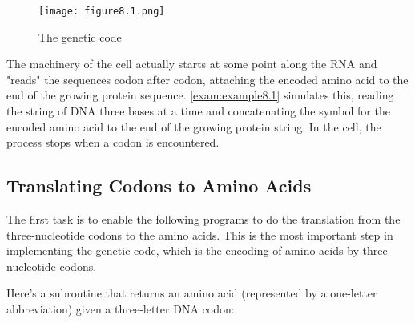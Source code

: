 \begin{figure}
  \centering
  \texttt{[image: figure8.1.png]}
  \caption{The genetic code}
  \label{fig:figure8.1}
\end{figure}

The machinery of the cell actually starts at some point along the RNA and "reads" the sequences codon after codon, attaching the encoded amino acid to the end of the growing protein sequence. \autoref{exam:example8.1} simulates this, reading the string of DNA three bases at a time and concatenating the symbol for the encoded amino acid to the end of the growing protein string. In the cell, the process stops when a codon is encountered. 

\subsection{Translating Codons to Amino Acids}
The first task is to enable the following programs to do the translation from the three-nucleotide codons to the amino acids. This is the most important step in implementing the genetic code, which is the encoding of amino acids by three-nucleotide codons.

Here's a subroutine that returns an amino acid (represented by a one-letter abbreviation) given a three-letter DNA codon: 

